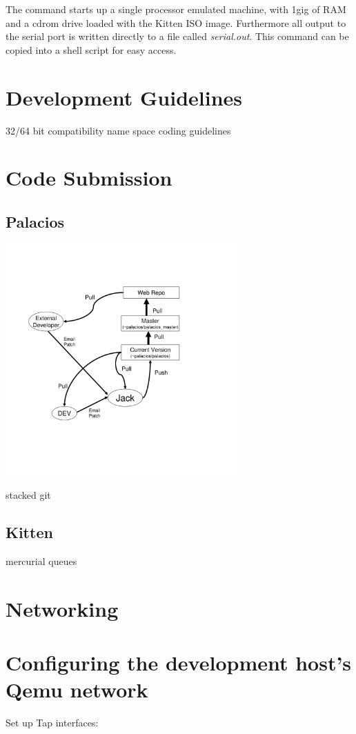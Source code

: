 \documentclass[11pt]{article}
\begin{document}
The command starts up a single processor emulated machine, with 1gig
of RAM and a cdrom drive loaded with the Kitten ISO image. Furthermore
all output to the serial port is written directly to a file called
{\em serial.out}. This command can be copied into a shell script for easy access.

\section{Development Guidelines}

32/64 bit compatibility
name space
coding guidelines


\section{Code Submission}
\label{sec:submission}
\subsection{Palacios}

\includegraphics[height=3.5in]{dev_chart.pdf}

stacked git

\subsection{Kitten}

mercurial queues

\section{Networking}

\section{Configuring the development host's Qemu network}
Set up Tap interfaces:
\end{document}

